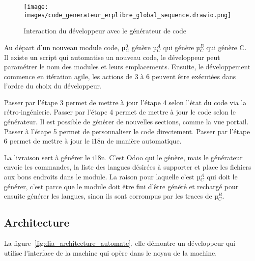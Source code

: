 \begin{figure}[htb]
\centering
\texttt{[image: images/code\_generateur\_erplibre\_global\_sequence.drawio.png]}
\caption{Interaction du développeur avec le générateur de code}
\label{fig:dia_sequence_gc}
\end{figure}

Au départ d’un nouveau module code, µ$_C^0$ génère µ$_C^A$ qui génère µ$_C^B$ qui génère C. Il existe un script qui automatise un nouveau code, le développeur peut paramétrer le nom des modules et leurs emplacements. Ensuite, le développement commence en itération agile, les actions de 3 à 6 peuvent être exécutées dans l’ordre du choix du développeur.


Passer par l’étape 3 permet de mettre à jour l’étape 4 selon l’état du code via la rétro-ingénierie. Passer par l’étape 4 permet de mettre à jour le code selon le générateur. Il est possible de générer de nouvelles sections, comme la vue portail. Passer à l’étape 5 permet de personnaliser le code directement. Passer par l’étape 6 permet de mettre à jour le i18n de manière automatique.

La livraison sert à générer le i18n. C’est Odoo qui le génère, mais le générateur envoie les commandes, la liste des langues désirées à supporter et place les fichiers aux bons endroits dans le module. La raison pour laquelle c’est µ$_C^A$ qui doit le générer, c’est parce que le module doit être fini d’être généré et rechargé pour ensuite générer les langues, sinon ils sont corrompus par les traces de µ$_C^B$.


\subsection{Architecture}

La figure~\ref{fig:dia_architecture_automate}, elle démontre un développeur qui utilise l'interface de la machine qui opère dans le noyau de la machine.

